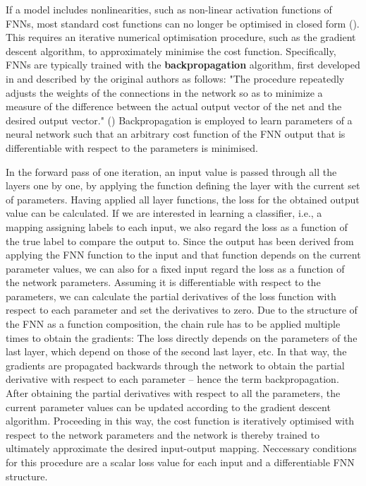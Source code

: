 If a model includes nonlinearities, such as non-linear activation functions of FNNs, most standard cost functions can no longer be optimised in closed form (\cite[Chapter 5, p.~151]{Goodfellow2016}). This requires an iterative numerical optimisation procedure, such as the gradient descent algorithm, to approximately minimise the cost function. 
Specifically, FNNs are typically trained with the \textbf{backpropagation} algorithm, first developed in \cite{Rumelhart1986} and described by the original authors as follows: "The procedure repeatedly adjusts the weights of the connections in the network so as to minimize a measure of the difference between the actual output vector of the net and the desired output vector." (\cite[p.~533]{Rumelhart1986})
Backpropagation is employed to learn parameters of a neural network such that an arbitrary cost function of the FNN output that is differentiable with respect to the parameters is minimised. 

In the forward pass of one iteration, an input value is passed through all the layers one by one, by applying the function defining the layer with the current set of parameters. 
Having applied all layer functions, the loss for the obtained output value can be calculated.
If we are interested in learning a classifier, i.e., a mapping assigning labels to each input, we also regard the loss as a function of the true label to compare the output to.
Since the output has been derived from applying the FNN function to the input and that function depends on the current parameter values, we can also for a fixed input regard the loss as a function of the network parameters. Assuming it is differentiable with respect to the parameters, we can calculate the partial derivatives of the loss function with respect to each parameter and set the derivatives to zero. 
Due to the structure of the FNN as a function composition, the chain rule has to be applied multiple times to obtain the gradients: The loss directly depends on the parameters of the last layer, which depend on those of the second last layer, etc. In that way, the gradients are propagated backwards through the network to obtain the partial derivative with respect to each parameter -- hence the term backpropagation. After obtaining the partial derivatives with respect to all the parameters, the current parameter values can be updated according to the gradient descent algorithm. Proceeding in this way, the cost function is iteratively optimised with respect to the network parameters and the network is thereby trained to ultimately approximate the desired input-output mapping. Neccessary conditions for this procedure are a scalar loss value for each input and a differentiable FNN structure.

